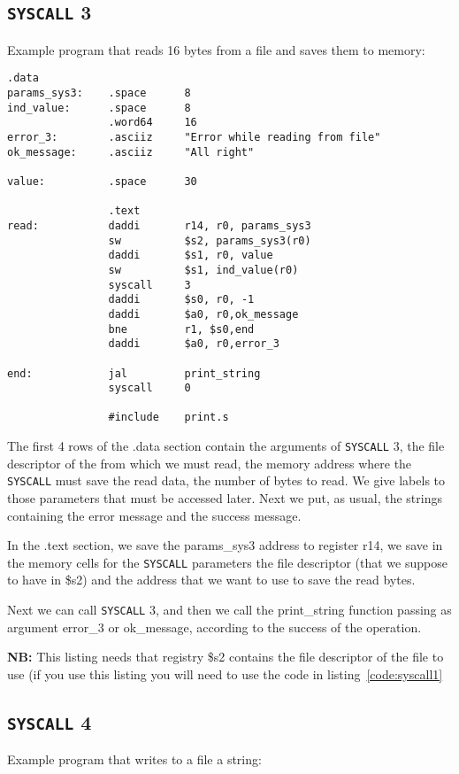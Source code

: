 \documentclass[12pt]{report}
\newcommand{\SC}{\texttt{SYSCALL}}
\newcommand{\OF}{\textbf{NB:} This listing needs that registry \$s2 contains the
file descriptor of the file to use (if you use this listing you will need to use
the code in listing~\ref{code:syscall1}}
\begin{document}
\subsection{\SC{} 3}
Example program that reads 16 bytes from a file and saves them to memory:
\begin{lstlisting}[caption={\SC{} 3 example}, label={code:syscall3}, style={mips}]
                .data
params_sys3:    .space      8                
ind_value:      .space      8            
                .word64     16        
error_3:        .asciiz     "Error while reading from file"    
ok_message:     .asciiz     "All right"    

value:          .space      30                    

                .text
read:           daddi       r14, r0, params_sys3 
                sw          $s2, params_sys3(r0)
                daddi       $s1, r0, value            
                sw          $s1, ind_value(r0)            
                syscall     3            
                daddi       $s0, r0, -1            
                daddi       $a0, r0,ok_message            
                bne         r1, $s0,end            
                daddi       $a0, r0,error_3

end:            jal         print_string
                syscall     0
        
                #include    print.s 
\end{lstlisting}
The first 4 rows of the .data section contain the arguments of \SC{} 3, the file
descriptor of the from which we must read, the memory address where the \SC{}
must save the read data, the number of bytes to read. We give labels to those
parameters that must be accessed later.  Next we put, as usual, the strings
containing the error message and the success message.

In the .text section, we save the params\_sys3 address to register r14, we save
in the memory cells for the \SC{} parameters the file descriptor (that we
suppose to have in \$s2) and the address that we want to use to save the read
bytes.

Next we can call \SC{} 3, and then we call the print\_string function passing as
argument error\_3 or ok\_message, according to the success of the operation.

\OF{}

\subsection{\SC{} 4}
Example program that writes to a file a string:
\end{document}
